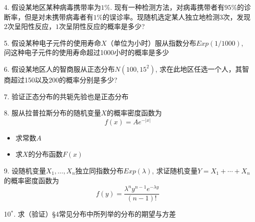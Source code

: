 
\begin{frame}

4. 假设某地区某种病毒携带率为$1\%$. 现有一种检测方法，对病毒携带者有$95\%$的诊断率，但是对未携带病毒者有$1\%$的误诊率。现随机选定某人独立地检测$3$次，发现$2$次呈阳性反应，$1$次呈阴性反应的概率是多少?

\vspace{1em}

5. 假设某种电子元件的使用寿命$X$（单位为小时）服从指数分布$Exp(1/1000)$, 问这种电子元件的使用寿命超过1000小时的概率是多少

\vspace{1em}

6. 假设某地区人的智商服从正态分布$N(100, 15^2)$, 求在此地区任选一个人，其智商超过150以及200的概率分别是多少?

\vspace{1em}

7. 验证正态分布的共轭先验也是正态分布

\end{frame}


\begin{frame}

8. 服从拉普拉斯分布的随机变量$X$的概率密度函数为
\[f(x) = Ae^{-|x|}\]
\begin{itemize}
\item[(1)] 求常数$A$
\vspace{0.4em}
\item[(2)] 求$X$的分布函数$F(x)$
\end{itemize}

\vspace{1em}

9. 设随机变量$X_1,\ldots,X_n$独立同指数分布$Exp(\lambda)$, 求证随机变量$Y = X_1 + \cdots + X_n$的概率密度函数为
\[f(y) = \dfrac{\lambda^n y^{n-1} e^{-\lambda y}}{(n-1)!}\]

10$^*$. 求（验证）\S 4常见分布中所列举的分布的期望与方差

\end{frame}


